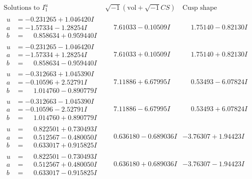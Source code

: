 \documentclass[1p]{elsarticle_modified}
\theoremstyle{definition}
\newcommand{\I}{\sqrt{-1}}
\begin{document}
$$\begin{array}{c|c|c}  
\text{Solutions to }I^u_{1}& \I (\text{vol} + \sqrt{-1}CS) & \text{Cusp shape}\\
 \hline 
\begin{aligned}
u &= -0.231265 + 1.046420 I \\
a &= -1.57334 - 1.28254 I \\
b &= \phantom{-}0.858634 + 0.959440 I\end{aligned}
 & \phantom{-}7.61033 - 0.10509 I & \phantom{-}1.75140 - 0.82130 I \\ \hline\begin{aligned}
u &= -0.231265 - 1.046420 I \\
a &= -1.57334 + 1.28254 I \\
b &= \phantom{-}0.858634 - 0.959440 I\end{aligned}
 & \phantom{-}7.61033 + 0.10509 I & \phantom{-}1.75140 + 0.82130 I \\ \hline\begin{aligned}
u &= -0.312663 + 1.045390 I \\
a &= -0.10596 + 2.52791 I \\
b &= \phantom{-}1.014760 - 0.890779 I\end{aligned}
 & \phantom{-}7.11886 + 6.67995 I & \phantom{-}0.53493 - 6.07824 I \\ \hline\begin{aligned}
u &= -0.312663 - 1.045390 I \\
a &= -0.10596 - 2.52791 I \\
b &= \phantom{-}1.014760 + 0.890779 I\end{aligned}
 & \phantom{-}7.11886 - 6.67995 I & \phantom{-}0.53493 + 6.07824 I \\ \hline\begin{aligned}
u &= \phantom{-}0.822501 + 0.730493 I \\
a &= \phantom{-}0.512567 - 0.480050 I \\
b &= \phantom{-}0.633017 + 0.915825 I\end{aligned}
 & \phantom{-}0.636180 - 0.689036 I & -3.76307 + 1.94423 I \\ \hline\begin{aligned}
u &= \phantom{-}0.822501 - 0.730493 I \\
a &= \phantom{-}0.512567 + 0.480050 I \\
b &= \phantom{-}0.633017 - 0.915825 I\end{aligned}
 & \phantom{-}0.636180 + 0.689036 I & -3.76307 - 1.94423 I \\ \hline\begin{aligned}

\end{aligned}
\end{array}$$
\end{document}
